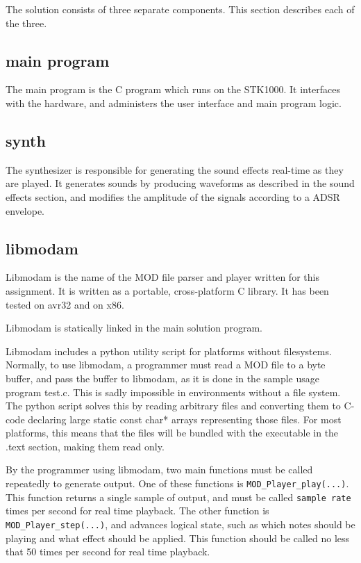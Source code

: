The solution consists of three separate components. This section describes each of the three.

\subsection{main program}

The main program is the C program which runs on the STK1000.
It interfaces with the hardware, and administers the user interface and main program logic.

\subsection{synth}

The synthesizer is responsible for generating the sound effects real-time as they are played.
It generates sounds by producing waveforms as described in the sound effects section, and modifies the amplitude of the signals according to a ADSR envelope.

\subsection{libmodam}

Libmodam is the name of the MOD file parser and player written for this assignment.
It is written as a portable, cross-platform C library.
It has been tested on avr32 and on x86.

Libmodam is statically linked in the main solution program.

Libmodam includes a python utility script for platforms without filesystems.
Normally, to use libmodam, a programmer must read a MOD file to a byte buffer, and pass the buffer to libmodam, as it is done in the sample usage program test.c.
This is sadly impossible in environments without a file system.
The python script solves this by reading arbitrary files and converting them to C-code declaring large static const char* arrays representing those files.
For most platforms, this means that the files will be bundled with the executable in the .text section, making them read only.

By the programmer using libmodam, two main functions must be called repeatedly to generate output.
One of these functions is \texttt{MOD\_Player\_play(...)}.
This function returns a single sample of output, and must be called \texttt{sample rate} times per second for real time playback.
The other function is \texttt{MOD\_Player\_step(...)}, and advances logical state, such as which notes should be playing and what effect should be applied.
This function should be called no less that 50 times per second for real time playback.

